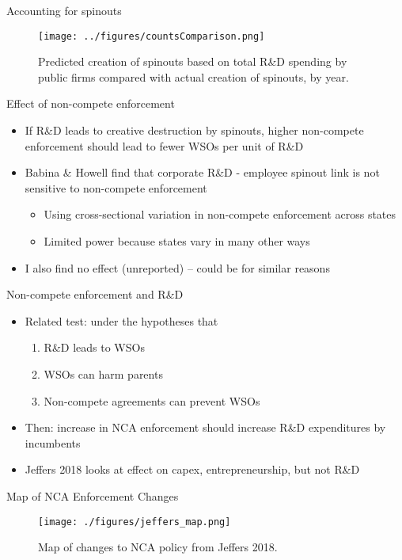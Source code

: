 \documentclass[english,usenames,dvipsnames]{beamer}
\begin{document}
\begin{frame}{Accounting for spinouts}
\begin{figure}
	\texttt{[image: ../figures/countsComparison.png]}
	\caption{Predicted creation of spinouts based on total R\&D spending by public firms compared with actual creation of spinouts, by year.}
\end{figure}
\end{frame}

\begin{frame}{Effect of non-compete enforcement}
\begin{itemize}
	\item If R\&D leads to creative destruction by spinouts, higher non-compete enforcement should lead to fewer WSOs per unit of R\&D
	\item Babina \& Howell find that corporate R\&D - employee spinout link is not sensitive to non-compete enforcement
	\begin{itemize}
		\item Using cross-sectional variation in non-compete enforcement across states
		\item Limited power because states vary in many other ways 
	\end{itemize}
	\item I also find no effect (unreported) -- could be for similar reasons
\end{itemize}
\end{frame}

\begin{frame}{Non-compete enforcement and R\&D}
\begin{itemize}
	\item Related test: under the hypotheses that
	\begin{enumerate}
		\item R\&D leads to WSOs
		\item WSOs can harm parents
		\item Non-compete agreements can prevent WSOs
	\end{enumerate}
	\item Then: increase in NCA enforcement should increase R\&D expenditures by incumbents
	\item Jeffers 2018 looks at effect on capex, entrepreneurship, but not R\&D
\end{itemize}
\end{frame}

\begin{frame}{Map of NCA Enforcement Changes}
\begin{figure}	
	\texttt{[image: ./figures/jeffers\_map.png]}
	\caption{Map of changes to NCA policy from Jeffers 2018.}
\end{figure}
\end{frame}
\end{document}
